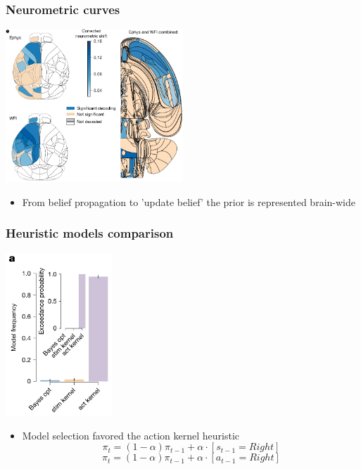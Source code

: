 \documentclass{beamer}
\begin{document}
\begin{frame}
  \frametitle{Neurometric curves}
  \begin{center}
    \includegraphics[width=0.5\textwidth, keepaspectratio]{./figure3e}
  \end{center}
  \begin{itemize}
    \item From belief propagation to 'update belief' the prior is represented brain-wide
  \end{itemize}
\end{frame}

\begin{frame}
  \frametitle{Heuristic models comparison}
  \begin{center}
    \includegraphics[width=0.3\textwidth, keepaspectratio]{./figure4a}
  \end{center}
  \begin{itemize}
    \item Model selection favored the action kernel heuristic
      \begin{equation}
        \pi_{t} = (1 - \alpha) \pi_{t-1} + \alpha \cdot [s_{t-1} = Right]
      \end{equation}
      \begin{equation}
        \pi_{t} = (1 - \alpha) \pi_{t-1} + \alpha \cdot [a_{t-1} = Right]
      \end{equation}
  \end{itemize}
\end{frame}
\end{document}
